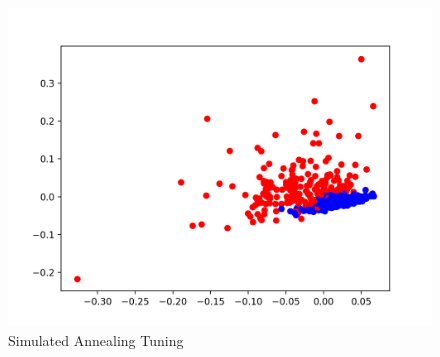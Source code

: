 \documentclass[a4paper,12pt]{article}
\begin{document}
\begin{figure}[!htb]
\begin{minipage}{0.33\textwidth}
     \end{minipage}\hfill
     \begin{minipage}{0.33\textwidth}
     \centering
     \includegraphics[width=.95\linewidth]{ica_d1_visuak}
   \end{minipage}\hfill
 \caption { Simulated Annealing Tuning}
\end{figure}
\end{document}

